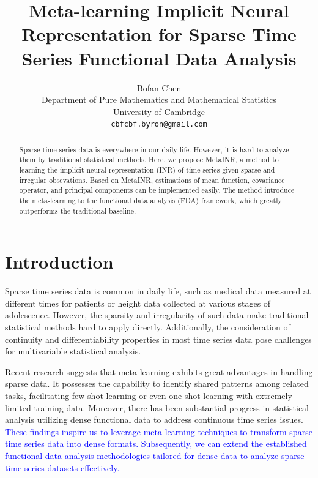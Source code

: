 \documentclass{article}
\title{Meta-learning Implicit Neural Representation for Sparse Time Series Functional Data Analysis}
\author{%
  Bofan Chen\\
  Department of Pure Mathematics and Mathematical Statistics\\
  University of Cambridge\\
  \texttt{cbfcbf.byron@gmail.com} \\}
\begin{document}
\maketitle

\begin{abstract}
  Sparse time series data is everywhere in our daily life. However, it is hard to analyze them by traditional statistical methods. Here, we propose MetaINR, a method to learning the implicit neural representation (INR) of time series given sparse and irregular obsevations.
  Based on MetaINR, estimations of mean function, covariance operator, and principal components can be implemented easily.
  The method introduce the meta-learning to the functional data analysis (FDA) framework, which greatly outperforms the traditional baseline.
\end{abstract}

\section{Introduction}
Sparse time series data is common in daily life, such as medical data measured at different times for patients or height data collected at various stages of adolescence. 
However, the sparsity and irregularity of such data make traditional statistical methods hard to apply directly. 
Additionally, the consideration of continuity and differentiability properties in most time series data pose challenges for multivariable statistical analysis.

Recent research suggests that meta-learning exhibits great advantages in handling sparse data. 
It possesses the capability to identify shared patterns among related tasks, 
facilitating few-shot learning or even one-shot learning with extremely limited training data. 
Moreover, there has been substantial progress in statistical analysis utilizing dense functional data to address continuous time series issues. 
\textcolor{blue}{These findings inspire us to leverage meta-learning techniques to transform sparse time series data into dense formats.
Subsequently, we can extend the established functional data analysis methodologies tailored for dense data to analyze sparse time series datasets effectively.
}
\end{document}

